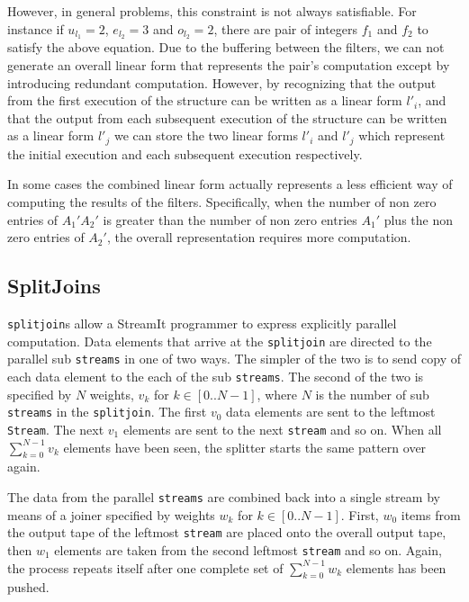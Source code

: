
However, in general problems, this constraint is not always satisfiable. For instance if
$u_{l_1}=2$, $e_{l_2}=3$ and $o_{l_2}=2$, there are pair of integers $f_1$ and $f_2$ to 
satisfy the above equation. Due to the buffering between the filters, we can not generate an 
overall linear form that represents the pair's computation except by introducing redundant
computation. However, by recognizing that the output from the first execution of the structure
can be written as a linear form $l'_i$, and that the output from each subsequent execution
of the structure can be written as a linear form $l'_j$ we can store the two linear forms $l'_i$ and
$l'_j$ which represent the initial execution and each subsequent execution respectively.

In some cases the combined linear form
actually represents a less efficient way of computing the results of the
filters. Specifically, when the number of non zero entries of $A_1'A_2'$ is greater
than the number of non zero entries $A_1'$ plus the non zero entries of $A_2'$, the overall
representation requires more computation.


\subsection{SplitJoins}
{\tt splitjoin}s allow a StreamIt programmer to express explicitly parallel computation. 
Data elements that arrive at the {\tt splitjoin} are directed
to the parallel sub {\tt streams} in one of two ways.
The simpler of the two is to send copy of each data element to the each of the sub {\tt streams}. 
The second of the two is specified by $N$ weights, $v_k$ for $k\in[0..N-1]$, 
where $N$ is the number of sub {\tt streams} in the {\tt splitjoin}. The first $v_0$ data elements
are sent to the leftmost {\tt Stream}. The next $v_1$ elements are sent 
to the next {\tt stream} and so on. When all $\sum_{k=0}^{N-1} v_k$ elements
have been seen, the splitter starts the same pattern over again.

The data from the parallel {\tt streams} are combined back into a single stream by means of
a joiner specified by weights $w_k$ for $k\in[0..N-1]$. First, $w_0$ items from the output tape of the 
leftmost {\tt stream} are placed onto the overall output tape, then 
$w_1$ elements are taken from the second leftmost {\tt stream} and so on. 
Again, the process repeats itself after one complete set of $\sum_{k=0}^{N-1} w_k$ 
elements has been pushed.

